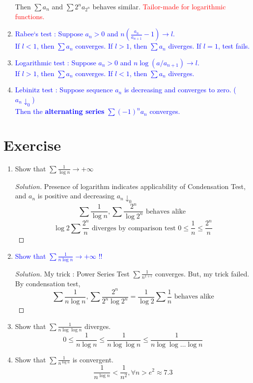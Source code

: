 \begin{enumerate}
{		Then $\sum a_n$ and $\sum 2^na_{2^n}$ behaves similar. \textcolor{red}{Tailor-made for logarithmic functions.}}
	\item \textcolor{blue}{Rabee`s test : Suppose $a_n > 0$ and $n\left(\frac{a_n}{a_{n+1}} -1 \right) \to l$.\\
		If $l < 1$, then $\sum a_n$ converges. If $l > 1$, then $\sum a_n$ diverges. If $l = 1$, test fails.}
	\item \textcolor{blue}{Logarithmic test : Suppose $a_n > 0$ and $n\log (a/a_{n+1}) \to l$.\\
		If $l > 1$, then $\sum a_n$ converges. If $l <1$, then $\sum a_n$ diverges.}
	\item \textcolor{blue}{Lebinitz test : Suppose sequence $a_n$ is decreasing and converges to zero. ($a_n \downarrow_0$)\\
		Then the \textbf{alternating series} $\sum (-1)^n a_n$ converges.}
\end{enumerate}

\section*{Exercise}
\begin{enumerate}
	\item Show that $\sum \frac{1}{\log n} \to +\infty$ 
	\begin{proof}[Solution]
		Presence of logarithm indicates applicability of Condensation Test, and $a_n$ is positive and decreasing $a_n \downarrow_0$
		$$ \sum \frac{1}{\log n}, \sum \frac{2^n}{\log 2^n} \text{ behaves alike } $$
		$$ \log 2 \sum \frac{2^n}{n} \text{ diverges by comparison test } 0 \le \frac{1}{n} \le \frac{2^n}{n} $$
	\end{proof}
	\item \textcolor{blue}{Show that $\sum \frac{1}{n\log n} \to +\infty$ !!}
	\begin{proof}[Solution]
		My trick : Power Series Test $\sum \frac{1}{n^{1+\epsilon}}$ converges. But, my trick failed.\\
		By condensation test,
		$$ \sum \frac{1}{n\log n}, \sum \frac{2^n}{2^n \log 2^n} = \frac{1}{\log 2} \sum \frac{1}{n} \text{ behaves alike} $$
	\end{proof}
	\item Show that $\sum \frac{1}{n \log \log n}$ diverges.
		$$ 0 \le \frac{1}{n \log n} \le \frac{1}{n \log \log n} \le \frac{1}{n \log \log \dots \log n} $$
	\item Show that $\sum \frac{1}{n^{\log n}}$ is convergent.
	$$\frac{1}{n^{\log n}} < \frac{1}{n^2}, \forall n > e^2 \approx 7.3$$
\end{enumerate}
